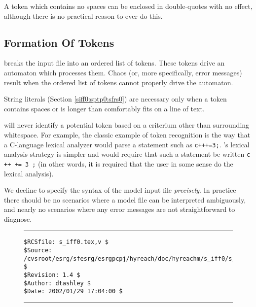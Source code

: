 A token which contains no spaces can be enclosed in double-quotes with no 
effect, although there is no practical reason to ever do this.


\subsection{Formation Of Tokens}
\label{siff0:sptk0}

\swname{} breaks the input file into an ordered list of tokens.  These tokens
drive an automaton which processes them.  Chaos (or, more specifically, error
messages) result when the ordered list of tokens cannot properly drive
the automaton.

String literals (Section \ref{siff0:sptp0:sfrs0}) are necessary only 
when a token contains spaces
or is longer than comfortably fits on a line of text.

\swname{} will never identify a potential token based on a criterium other than
surrounding whitespace.  For example, the classic example of token 
recognition is the way that a C-language lexical analyzer would 
parse a statement such as \texttt{c+++=3;}.  \swname{}'s lexical analysis strategy
is simpler and would require that such a statement be written 
\texttt{c ++ += 3 ;} (in other words, it is required that the user in
some sense do the lexical analysis).

We decline to specify the syntax of the \swname{} model input file
\emph{precisely}.  In practice there should be no scenarios where a model file 
can be interpreted ambiguously, and nearly no scenarios where any error messages
are not straightforward to diagnose.


\noindent\begin{figure}[!b]
\noindent\rule[-0.25in]{\textwidth}{1pt}
\begin{tiny}
\begin{verbatim}
$RCSfile: s_iff0.tex,v $
$Source: /cvsroot/esrg/sfesrg/esrgpcpj/hyreach/doc/hyreachm/s_iff0/s_iff0.tex,v $
$Revision: 1.4 $
$Author: dtashley $
$Date: 2002/01/29 17:04:00 $
\end{verbatim}
\end{tiny}
\noindent\rule[0.25in]{\textwidth}{1pt}
\end{figure}
%
%
%
%
